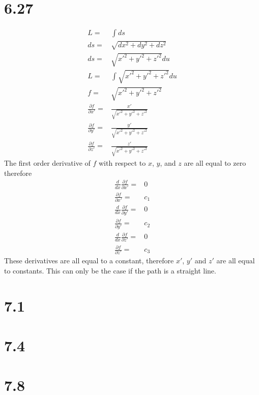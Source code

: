 \documentclass[12pt, a4paper]{article}
\begin{document}
\section{6.27}
\begin{align*}
L =& \int ds
\\
ds =& \sqrt{dx^2+dy^2+dz^2}
\\
ds =& \sqrt{x'^2 + y'^2 + z'^2} du
\\
L =& \int \sqrt{x'^2 + y'^2 + z'^2} du
\\ 
f =& \sqrt{x'^2 + y'^2 + z'^2}
\\
\frac{\partial f}{\partial x'} =& \frac{x'}{\sqrt{x'^2 + y'^2 + z'^2}}
\\
\frac{\partial f}{\partial y'} =& \frac{y'}{\sqrt{x'^2 + y'^2 + z'^2}}
\\
\frac{\partial f}{\partial z'} =& \frac{z'}{\sqrt{x'^2 + y'^2 + z'^2}}
\end{align*}
The first order derivative of $f$ with respect to $x$, $y$, and $z$ are all equal to zero therefore
\begin{align*}
\frac{d}{dx}\frac{\partial f}{\partial x'} =& 0
\\
\frac{\partial f}{\partial x'} =& c_1
\\
\frac{d}{dx}\frac{\partial f}{\partial y'} =& 0
\\
\frac{\partial f}{\partial y'} =& c_2
\\
\frac{d}{dx}\frac{\partial f}{\partial z'} =& 0
\\
\frac{\partial f}{\partial z'} =& c_3
\end{align*}
These derivatives are all equal to a constant, therefore $x'$, $y'$ and $z'$ are all equal to constants. This can only be the case if the path is a straight line. 


\pagebreak
\section{7.1}


\section{7.4}


\section{7.8}
\end{document}
